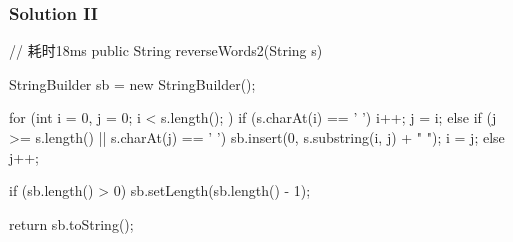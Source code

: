 \newpage

\subsubsection{Solution II}

\begin{Code}
// 耗时18ms
public String reverseWords2(String s) {
    StringBuilder sb = new StringBuilder();

    for (int i = 0, j = 0; i < s.length(); ) {
        if (s.charAt(i) == ' ') {
            i++;
            j = i;
        } else if (j >= s.length() || s.charAt(j) == ' ') {
            sb.insert(0, s.substring(i, j) + " ");
            i = j;
        } else {
            j++;
        }
    }

    if (sb.length() > 0) {
        sb.setLength(sb.length() - 1);
    }

    return sb.toString();
}
\end{Code}

\newpage

